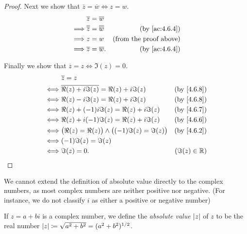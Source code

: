 \begin{proof}
  Next we show that \(\overline{z} = \overline{w} \iff z = w\).
  \begin{align*}
             & \overline{z} = \overline{w}                                                       \\
    \implies & \overline{\overline{z}} = \overline{\overline{w}} & \text{(by \cref{ac:4.6.4})}   \\
    \implies & z = w                                             & \text{(from the proof above)} \\
    \implies & \overline{z} = \overline{w}.                      & \text{(by \cref{ac:4.6.4})}
  \end{align*}

  Finally we show that \(\overline{z} = z \iff \Im(z) = 0\).
  \begin{align*}
         & \overline{z} = z                                                                          \\
    \iff & \overline{\Re(z) + i \Im(z)} = \Re(z) + i \Im(z)               & \text{(by \cref{4.6.8})} \\
    \iff & \Re(z) - i \Im(z) = \Re(z) + i \Im(z)                          & \text{(by \cref{4.6.8})} \\
    \iff & \Re(z) + (-1) i \Im(z) = \Re(z) + i \Im(z)                     & \text{(by \cref{4.6.7})} \\
    \iff & \Re(z) + i (-1) \Im(z) = \Re(z) + i \Im(z)                     & \text{(by \cref{4.6.6})} \\
    \iff & \big(\Re(z) = \Re(z)\big) \land \big((-1) \Im(z) = \Im(z)\big) & \text{(by \cref{4.6.2})} \\
    \iff & (-1) \Im(z) = \Im(z)                                                                      \\
    \iff & \Im(z) = 0.                                                    & (\Im(z) \in \R)
  \end{align*}
\end{proof}

\begin{note}
  We cannot extend the definition of absolute value directly to the complex numbers, as most complex numbers are neither positive nor negative.
  (For instance, we do not classify \(i\) as either a positive or negative number)
\end{note}

\begin{defn}\label{4.6.10}
  If \(z = a + bi\) is a complex number, we define the \emph{absolute value} \(\left\lvert z\right\rvert\) of \(z\) to be the real number \(\left\lvert z\right\rvert \coloneqq \sqrt{a^2 + b^2} = (a^2 + b^2)^{1 / 2}\).
\end{defn}


